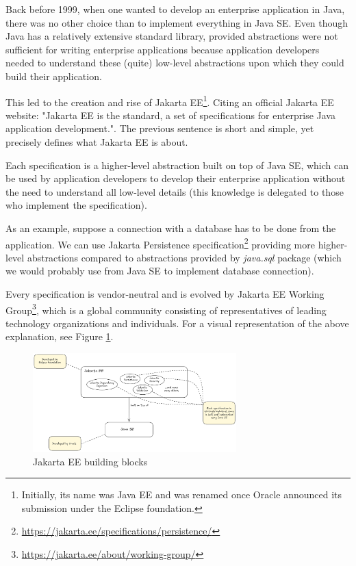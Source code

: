 \documentclass[../main.tex]{subfiles}
\begin{document}
Back before 1999, when one wanted to develop an enterprise application in Java, there was no other choice than to implement everything in Java SE. Even though Java has a relatively extensive standard library, provided abstractions were not sufficient for writing enterprise applications because application developers needed to understand these (quite) low-level abstractions upon which they could build their application.

This led to the creation and rise of Jakarta EE\footnote{Initially, its name was Java EE and was renamed once Oracle announced its submission under the Eclipse foundation.}. Citing an official Jakarta EE website: "Jakarta EE is the standard, a set of specifications for enterprise Java application development."\cite{jakartaee}. The previous sentence is short and simple, yet precisely defines what Jakarta EE is about.

Each specification is a higher-level abstraction built on top of Java SE, which can be used by application developers to develop their enterprise application without the need to understand all low-level details (this knowledge is delegated to those who implement the specification).

As an example, suppose a connection with a database has to be done from the application. We can use Jakarta Persistence specification\footnote{\url{https://jakarta.ee/specifications/persistence/}} providing more higher-level abstractions compared to abstractions provided by \textit{java.sql} package (which we would probably use from Java SE to implement database connection).

Every specification is vendor-neutral and is evolved by Jakarta EE Working Group\footnote{\url{https://jakarta.ee/about/working-group/}}, which is a global community consisting of representatives of leading technology organizations and individuals. For a visual representation of the above explanation, see Figure \ref{fig:jakarta-ee}.

\begin{figure}
  \begin{center}
    \includegraphics[width=0.7\textwidth]{images/jakarta-ee.png}
  \end{center}
  \caption{Jakarta EE building blocks}
  \label{fig:jakarta-ee}
\end{figure}
\end{document}

